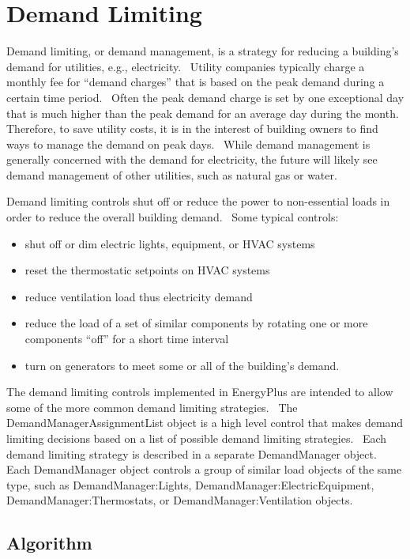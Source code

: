 \chapter{Demand Limiting}\label{demand-limiting}

Demand limiting, or demand management, is a strategy for reducing a building's demand for utilities, e.g., electricity.~ Utility companies typically charge a monthly fee for ``demand charges'' that is based on the peak demand during a certain time period.~ Often the peak demand charge is set by one exceptional day that is much higher than the peak demand for an average day during the month.~ Therefore, to save utility costs, it is in the interest of building owners to find ways to manage the demand on peak days.~ While demand management is generally concerned with the demand for electricity, the future will likely see demand management of other utilities, such as natural gas or water.

Demand limiting controls shut off or reduce the power to non-essential loads in order to reduce the overall building demand.~ Some typical controls:

\begin{itemize}
\item
  shut off or dim electric lights, equipment, or HVAC systems
\item
  reset the thermostatic setpoints on HVAC systems
\item
  reduce ventilation load thus electricity demand
\item
  reduce the load of a set of similar components by rotating one or more components ``off'' for a short time interval
\item
  turn on generators to meet some or all of the building's demand.
\end{itemize}

The demand limiting controls implemented in EnergyPlus are intended to allow some of the more common demand limiting strategies.~ The DemandManagerAssignmentList object is a high level control that makes demand limiting decisions based on a list of possible demand limiting strategies.~ Each demand limiting strategy is described in a separate DemandManager object.~ Each DemandManager object controls a group of similar load objects of the same type, such as DemandManager:Lights, DemandManager:ElectricEquipment, DemandManager:Thermostats, or DemandManager:Ventilation objects.

\section{Algorithm}\label{algorithm}


